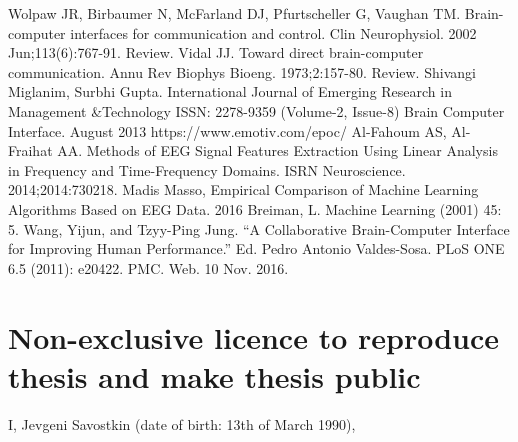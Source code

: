 \documentclass[12pt]{article}
\begin{document}
\newpage
\begin{thebibliography}{9}

Wolpaw JR, Birbaumer N, McFarland DJ, Pfurtscheller G, Vaughan TM.
Brain-computer interfaces for communication and control. Clin Neurophysiol. 2002 
Jun;113(6):767-91. Review.
Vidal JJ. Toward direct brain-computer communication. Annu Rev Biophys Bioeng.
1973;2:157-80. Review.
Shivangi Miglanim, Surbhi Gupta.  International Journal of Emerging Research in Management \&Technology
ISSN: 2278-9359 (Volume-2, Issue-8)
Brain Computer Interface. 
August 2013
https://www.emotiv.com/epoc/
Al-Fahoum AS, Al-Fraihat AA. Methods of EEG Signal Features Extraction Using Linear Analysis in Frequency and Time-Frequency Domains. ISRN Neuroscience. 2014;2014:730218.
Madis Masso, Empirical Comparison of Machine Learning Algorithms Based on EEG Data. 2016
Breiman, L. Machine Learning (2001) 45: 5. 
Wang, Yijun, and Tzyy-Ping Jung. ``A Collaborative Brain-Computer Interface for Improving Human Performance.'' Ed. Pedro Antonio Valdes-Sosa. PLoS ONE 6.5 (2011): e20422. PMC. Web. 10 Nov. 2016.
\end{thebibliography}

%

\appendix
\pagebreak
\section*{\small Non-exclusive licence to reproduce thesis and make thesis public}


I, Jevgeni Savostkin (date of birth: 13th of March 1990),
\end{document}
